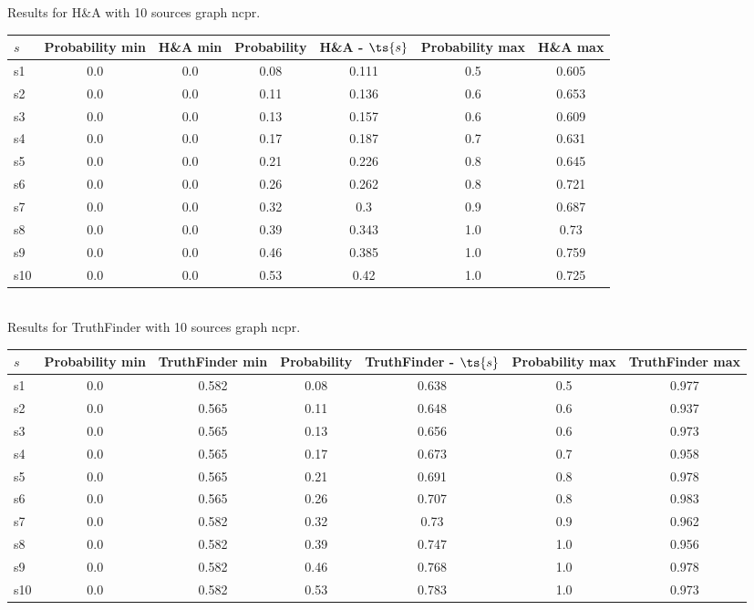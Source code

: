 \documentclass{article}
\begin{document}
\noindent Results for H\&A with 10 sources graph ncpr.

\noindent\begin{tabular}{|l|c|c|c|c|c|c|}
\hline
$s$& Probability min & H\&A min & Probability & H\&A - $\ts{s}$ & Probability max & H\&A max\\
\hline
s1 &0.0 & 0.0 & 0.08 & 0.111 & 0.5 & 0.605\\
\hline
s2 &0.0 & 0.0 & 0.11 & 0.136 & 0.6 & 0.653\\
\hline
s3 &0.0 & 0.0 & 0.13 & 0.157 & 0.6 & 0.609\\
\hline
s4 &0.0 & 0.0 & 0.17 & 0.187 & 0.7 & 0.631\\
\hline
s5 &0.0 & 0.0 & 0.21 & 0.226 & 0.8 & 0.645\\
\hline
s6 &0.0 & 0.0 & 0.26 & 0.262 & 0.8 & 0.721\\
\hline
s7 &0.0 & 0.0 & 0.32 & 0.3 & 0.9 & 0.687\\
\hline
s8 &0.0 & 0.0 & 0.39 & 0.343 & 1.0 & 0.73\\
\hline
s9 &0.0 & 0.0 & 0.46 & 0.385 & 1.0 & 0.759\\
\hline
s10 &0.0 & 0.0 & 0.53 & 0.42 & 1.0 & 0.725\\
\hline
\end{tabular}\\

\noindent Results for TruthFinder with 10 sources graph ncpr.

\noindent\begin{tabular}{|l|c|c|c|c|c|c|}
\hline
$s$& Probability min & TruthFinder min & Probability & TruthFinder - $\ts{s}$ & Probability max & TruthFinder max\\
\hline
s1 &0.0 & 0.582 & 0.08 & 0.638 & 0.5 & 0.977\\
\hline
s2 &0.0 & 0.565 & 0.11 & 0.648 & 0.6 & 0.937\\
\hline
s3 &0.0 & 0.565 & 0.13 & 0.656 & 0.6 & 0.973\\
\hline
s4 &0.0 & 0.565 & 0.17 & 0.673 & 0.7 & 0.958\\
\hline
s5 &0.0 & 0.565 & 0.21 & 0.691 & 0.8 & 0.978\\
\hline
s6 &0.0 & 0.565 & 0.26 & 0.707 & 0.8 & 0.983\\
\hline
s7 &0.0 & 0.582 & 0.32 & 0.73 & 0.9 & 0.962\\
\hline
s8 &0.0 & 0.582 & 0.39 & 0.747 & 1.0 & 0.956\\
\hline
s9 &0.0 & 0.582 & 0.46 & 0.768 & 1.0 & 0.978\\
\hline
s10 &0.0 & 0.582 & 0.53 & 0.783 & 1.0 & 0.973\\
\hline
\end{tabular}\\
\end{document}
